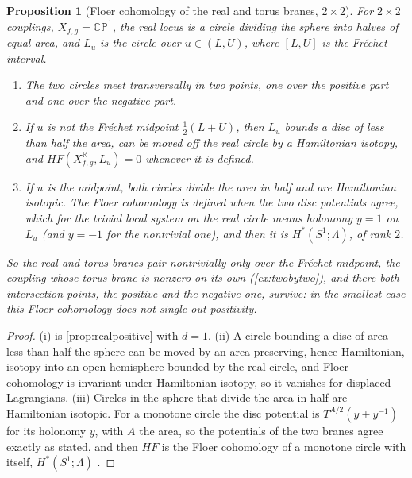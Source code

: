 \documentclass[11pt]{article}
\newtheorem{proposition}[theorem]{Proposition}
\theoremstyle{definition}
\theoremstyle{remark}
\newcommand{\R}{\mathbb{R}}
\begin{document}
\begin{proposition}[Floer cohomology of the real and torus branes, $2\times2$]\label{prop:hf22}
For $2\times2$ couplings, $X_{f,g}=\mathbb{CP}^1$, the real locus is a circle dividing the sphere into halves of equal area, and $L_u$ is the
circle over $u\in(L,U)$, where $[L,U]$ is the Fréchet interval.
\begin{enumerate}[label=(\roman*)]
\item The two circles meet transversally in two points, one over the positive part and one over the negative part.
\item If $u$ is not the Fréchet midpoint $\frac12(L+U)$, then $L_u$ bounds a disc of less than half the area, can be moved off the real circle
  by a Hamiltonian isotopy, and $HF(X^{\R}_{f,g},L_u)=0$ whenever it is defined.
\item If $u$ is the midpoint, both circles divide the area in half and are Hamiltonian isotopic. The Floer cohomology is defined when the
  two disc potentials agree, which for the trivial local system on the real circle means holonomy $y=1$ on $L_u$ (and $y=-1$ for the
  nontrivial one), and then it is $H^*(S^1;\Lambda)$, of rank $2$.
\end{enumerate}
So the real and torus branes pair nontrivially only over the Fréchet midpoint, the coupling whose torus brane is nonzero on its own
(\cref{ex:twobytwo}), and there both intersection points, the positive and the negative one, survive: in the smallest case this
Floer cohomology does not single out positivity.
\end{proposition}
\begin{proof}
(i) is \cref{prop:realpositive} with $d=1$. (ii) A circle bounding a disc of area less than half the sphere can be moved by an
area-preserving, hence Hamiltonian, isotopy into an open hemisphere bounded by the real circle, and Floer cohomology is invariant under
Hamiltonian isotopy, so it vanishes for displaced Lagrangians. (iii) Circles in the sphere that divide the area in half are Hamiltonian
isotopic. For a monotone circle the disc potential is $T^{A/2}(y+y^{-1})$ for its holonomy $y$, with $A$ the area, so the potentials of the
two branes agree exactly as stated, and then $HF$ is the Floer cohomology of a monotone circle with itself, $H^*(S^1;\Lambda)$ \cite{ChoOh2006}.
\end{proof}
\end{document}
